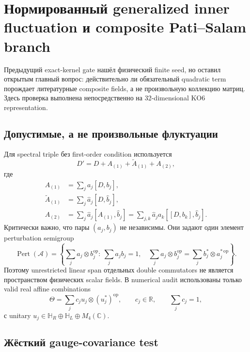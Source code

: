 \chapter{Нормированный generalized inner fluctuation и composite Pati--Salam branch}

Предыдущий exact-kernel gate нашёл физический finite seed, но оставил открытым
главный вопрос: действительно ли обязательный quadratic term порождает
литературные composite fields, а не произвольную коллекцию матриц. Здесь
проверка выполнена непосредственно на 32-dimensional KO6 representation.

\section{Допустимые, а не произвольные флуктуации}

Для spectral triple без first-order condition используется
\begin{equation}
 D'=D+A_{(1)}+\widetilde A_{(1)}+A_{(2)},
\end{equation}
где
\begin{align}
 A_{(1)}&=\sum_j a_j[D,b_j],\\
 \widetilde A_{(1)}&=\sum_j \widehat a_j[D,\widehat b_j],\\
 A_{(2)}&=\sum_j\widehat a_j[A_{(1)},\widehat b_j]
 =\sum_{j,k}\widehat a_j a_k[[D,b_k],\widehat b_j].
 \label{eq:ps-generalized-inner-fluctuation}
\end{align}
Критически важно, что пары \((a_j,b_j)\) не независимы. Они задают один
элемент perturbation semigroup
\begin{equation}
 \operatorname{Pert}(\mathcal A)=
 \left\{\sum_j a_j\otimes b_j^{\mathrm{op}}:\
 \sum_j a_jb_j=1,\quad
 \sum_j a_j\otimes b_j^{\mathrm{op}}
 =\sum_j b_j^*\otimes a_j^{*\,\mathrm{op}}\right\}.
 \label{eq:ps-pert-semigroup}
\end{equation}
Поэтому unrestricted linear span отдельных double commutators не является
пространством физических scalar fields. В numerical audit использованы
только valid real affine combinations
\begin{equation}
 \Theta=\sum_j c_j u_j\otimes(u_j^*)^{\mathrm{op}},
 \qquad c_j\in\mathbb R,
 \qquad \sum_jc_j=1,
 \end{equation}
с unitary \(u_j\in\mathbb H_R\oplus\mathbb H_L\oplus M_4(\mathbb C)\).

\section{Жёсткий gauge-covariance test}

